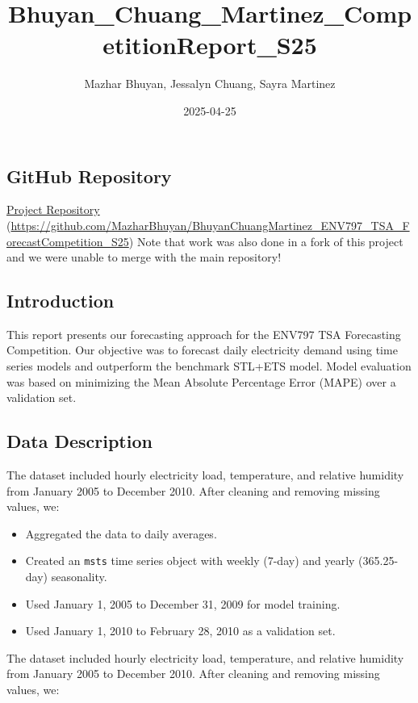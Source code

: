 \documentclass[
]{article}
\title{Bhuyan\_Chuang\_Martinez\_CompetitionReport\_S25}
\author{Mazhar Bhuyan, Jessalyn Chuang, Sayra Martinez}
\date{2025-04-25}
\providecommand{\tightlist}{%
  \setlength{\itemsep}{0pt}\setlength{\parskip}{0pt}}
\begin{document}
\maketitle

\subsection{GitHub Repository}\label{github-repository}

\href{https://github.com/jessalynlc/BhuyanChuangMartinez_ENV797_TSA_ForecastCompetition_S25}{Project
Repository}
(\url{https://github.com/MazharBhuyan/BhuyanChuangMartinez_ENV797_TSA_ForecastCompetition_S25})
\n*Note that work was also done in a fork of this project and we were
unable to merge with the main repository!

\subsection{Introduction}\label{introduction}

This report presents our forecasting approach for the ENV797 TSA
Forecasting Competition. Our objective was to forecast daily electricity
demand using time series models and outperform the benchmark STL+ETS
model. Model evaluation was based on minimizing the Mean Absolute
Percentage Error (MAPE) over a validation set.

\subsection{Data Description}\label{data-description}

The dataset included hourly electricity load, temperature, and relative
humidity from January 2005 to December 2010. After cleaning and removing
missing values, we:

\begin{itemize}
\tightlist
\item
  Aggregated the data to daily averages.
\item
  Created an \texttt{msts} time series object with weekly (7-day) and
  yearly (365.25-day) seasonality.
\item
  Used January 1, 2005 to December 31, 2009 for model training.
\item
  Used January 1, 2010 to February 28, 2010 as a validation set.
\end{itemize}

The dataset included hourly electricity load, temperature, and relative
humidity from January 2005 to December 2010. After cleaning and removing
missing values, we:
\end{document}
